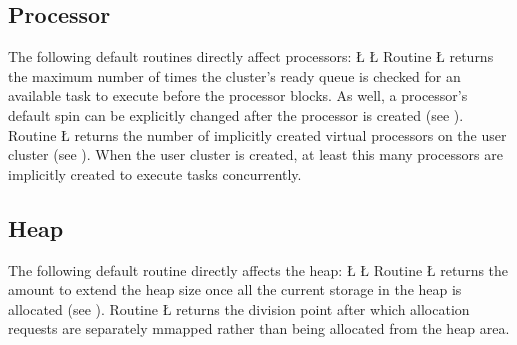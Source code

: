 \documentclass[openright,twoside]{report}
\begin{document}
\subsection{Processor}

The following default routines directly affect processors:
\LGinlinefalse\LGbegin\lgrinde
\L{}
\CE{}\L{}
\CE{}\endlgrinde\LGend
{}%
%
%
%
Routine \LGinlinetrue\LGbegin\lgrinde\L{}\endlgrinde\LGend{} returns the maximum number of times the cluster's ready queue is checked for an available task to execute before the processor blocks.
As well, a processor's default spin can be explicitly changed after the processor is created (see ).
Routine \LGinlinetrue\LGbegin\lgrinde\L{}\endlgrinde\LGend{} returns the number of implicitly created virtual processors on the user cluster (see ).
When the user cluster is created, at least this many processors are implicitly created to execute tasks concurrently.


\subsection{Heap}
\label{s:DefaultValuesHeap}

The following default routine directly affects the heap:
\LGinlinefalse\LGbegin\lgrinde
\L{}
\CE{}\L{}
\CE{}\endlgrinde\LGend
{}%
%
%
%
Routine \LGinlinetrue\LGbegin\lgrinde\L{}\endlgrinde\LGend{} returns the amount to extend the heap size once all the current storage in the heap is allocated (see ).
Routine \LGinlinetrue\LGbegin\lgrinde\L{}\endlgrinde\LGend{} returns the division point after which allocation requests are separately mmapped rather than being allocated from the heap area.
\end{document}
